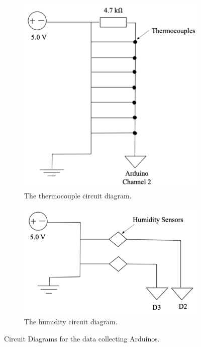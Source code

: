 \documentclass{article}
\begin{document}
\begin{figure}[H]

\begin{subfigure}{0.5\textwidth}
\includegraphics[scale = 1]{Thermocouple circuit.png} 
\caption{The thermocouple circuit diagram.}
\label{fig:CircuitDiagramsThermo}
\end{subfigure}
\begin{subfigure}{0.5\textwidth}
\includegraphics[scale = 1]{Humidity Circuit.png}
\caption{The humidity circuit diagram.}
\label{fig:CircuitDiagramsHum}
\end{subfigure}

\caption{Circuit Diagrams for the data collecting Arduinos.}
\label{fig:CircuitDiagrams}
\end{figure}
\end{document}
